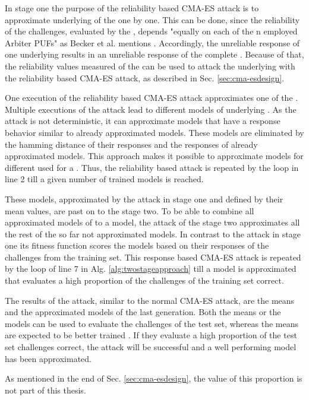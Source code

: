 In stage one the purpose of the reliability based \ac{CMA-ES} attack is to approximate underlying \apufs of the \xpuf one by one.
This can be done, since the reliability of the challenges, evaluated by the \xpuf, depends "equally on each of the n employed Arbiter PUFs" as Becker et al. mentions \cite{Becker2015ThePUFs}. %
Accordingly, the unreliable response of one underlying \apuf results in an unreliable response of the complete \puf.
Because of that, the reliability values measured of the \xpuf can be used to attack the underlying \apufs with the reliability based \ac{CMA-ES} attack, as described in Sec. \ref{sec:cma-esdesign}.

One execution of the reliability based \ac{CMA-ES} attack approximates one of the \apufs.
Multiple executions of the attack lead to different models of underlying \apufs. %
As the attack is not deterministic, it can approximate models that have a response behavior similar to already approximated models.
These models are eliminated by the hamming distance of their responses and the responses of already approximated models. %
This approach makes it possible to approximate models for different \apufs used for a \xpuf.
Thus, the reliability based attack is repeated by the loop in line 2 till a given number of trained models is reached.

These models, approximated by the attack in stage one and defined by their mean values, are past on to the stage two.
To be able to combine all approximated models of \apuf to a \xpuf model, the attack of the stage two approximates all the rest of the so far not approximated models. %
In contrast to the attack in stage one its fitness function scores the models based on their responses of the challenges from the training set. %
This response based \ac{CMA-ES} attack is repeated by the loop of line 7 in Alg. \ref{alg:twostageapproach} till a model is approximated that evaluates a high proportion of the challenges of the training set correct.

The results of the attack, similar to the normal \ac{CMA-ES} attack, are the means and the approximated models of the last generation.
Both the means or the models can be used to evaluate the challenges of the test set, whereas the means are expected to be better trained \cite{Wikipedia2017CMA-ES}.
If they evaluate a high proportion of the test set challenges correct, the attack will be successful and a well performing model has been approximated. %

As mentioned in the end of Sec. \ref{sec:cma-esdesign}, the value of this proportion is not part of this thesis.

